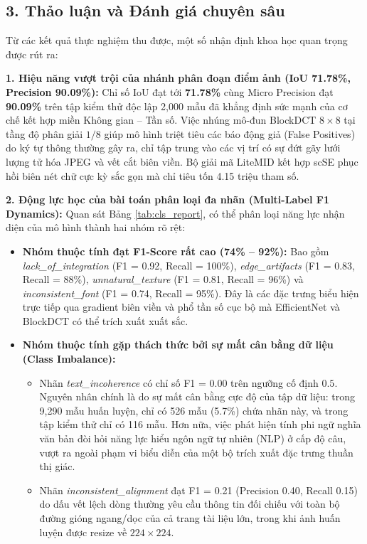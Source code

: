 \subsection{3. Thảo luận và Đánh giá chuyên sâu}

\indent\indent Từ các kết quả thực nghiệm thu được, một số nhận định khoa học quan trọng được rút ra:\vspace{0.3cm}

\textbf{1. Hiệu năng vượt trội của nhánh phân đoạn điểm ảnh (IoU 71.78\%, Precision 90.09\%):}
Chỉ số IoU đạt tới \textbf{71.78\%} cùng Micro Precision đạt \textbf{90.09\%} trên tập kiểm thử độc lập 2,000 mẫu đã khẳng định sức mạnh của cơ chế kết hợp miền Không gian -- Tần số. Việc nhúng mô-đun BlockDCT $8 \times 8$ tại tầng độ phân giải $1/8$ giúp mô hình triệt tiêu các báo động giả (False Positives) do ký tự thông thường gây ra, chỉ tập trung vào các vị trí có sự đứt gãy lưới lượng tử hóa JPEG và vết cắt biên viền. Bộ giải mã LiteMID kết hợp scSE phục hồi biên nét chữ cực kỳ sắc gọn mà chỉ tiêu tốn 4.15 triệu tham số.\vspace{0.3cm}

\textbf{2. Động lực học của bài toán phân loại đa nhãn (Multi-Label F1 Dynamics):}
Quan sát Bảng \ref{tab:cls_report}, có thể phân loại năng lực nhận diện của mô hình thành hai nhóm rõ rệt:
\begin{itemize}[label={--}, itemsep=2pt]
    \item \textbf{Nhóm thuộc tính đạt F1-Score rất cao (74\% -- 92\%):} Bao gồm \textit{lack\_of\_integration} (F1 = 0.92, Recall = 100\%), \textit{edge\_artifacts} (F1 = 0.83, Recall = 88\%), \textit{unnatural\_texture} (F1 = 0.81, Recall = 96\%) và \textit{inconsistent\_font} (F1 = 0.74, Recall = 95\%). Đây là các đặc trưng biểu hiện trực tiếp qua gradient biên viền và phổ tần số cục bộ mà EfficientNet và BlockDCT có thể trích xuất xuất sắc.
    \item \textbf{Nhóm thuộc tính gặp thách thức bởi sự mất cân bằng dữ liệu (Class Imbalance):}
    \begin{itemize}[label={+}, itemsep=1pt]
        \item Nhãn \textit{text\_incoherence} có chỉ số F1 = 0.00 trên ngưỡng cố định $0.5$. Nguyên nhân chính là do sự mất cân bằng cực độ của tập dữ liệu: trong 9,290 mẫu huấn luyện, chỉ có 526 mẫu (5.7\%) chứa nhãn này, và trong tập kiểm thử chỉ có 116 mẫu. Hơn nữa, việc phát hiện tính phi ngữ nghĩa văn bản đòi hỏi năng lực hiểu ngôn ngữ tự nhiên (NLP) ở cấp độ câu, vượt ra ngoài phạm vi biểu diễn của một bộ trích xuất đặc trưng thuần thị giác.
        \item Nhãn \textit{inconsistent\_alignment} đạt F1 = 0.21 (Precision 0.40, Recall 0.15) do dấu vết lệch dòng thường yêu cầu thông tin đối chiếu với toàn bộ đường gióng ngang/dọc của cả trang tài liệu lớn, trong khi ảnh huấn luyện được resize về $224 \times 224$.
    \end{itemize}
\end{itemize}\vspace{0.2cm}

